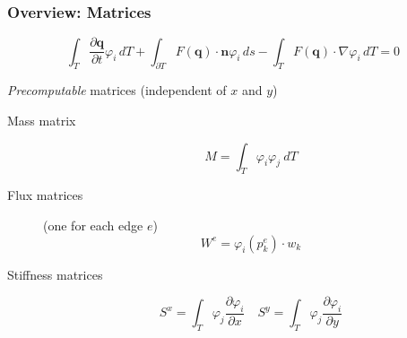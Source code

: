 \documentclass{beamer}
\newcommand{\pd}[2]{\dfrac{\partial #1}{\partial #2}}
\renewcommand{\phi}{\varphi}
\begin{document}

\begin{frame}
  \frametitle{Overview: Matrices}
  \vspace{-.3cm}
  \begin{equation*}
    \int_T \pd {\mathbf{q}}{t} \phi_i \, dT +
    \int_{\partial T} F(\mathbf{q}) \cdot \mathbf{n} \phi_i \, ds -
    \int_T F(\mathbf{q}) \cdot \nabla \phi_i \, dT = 0
  \end{equation*}
  \begin{block}{\emph{Precomputable} matrices (independent of $x$ and $y$)}
    \begin{description}
    \item[Mass matrix]
      \begin{equation}
        \label{eq:mass-matrix-overview}
        M = \int_T \phi_i \phi_j \ dT
      \end{equation}
    \item[Flux matrices] (one for each edge $e$) %
      \begin{equation}
        \label{eq:edge-matrices}
        W^e = \phi_i\left(p_k^e\right) \cdot w_k
      \end{equation}
    \item[Stiffness matrices]
      \begin{equation}
        \label{eq:stiffness-matrix-overview}
        S^x = \int_T \phi_j \pd{\phi_i}{x} \quad
        S^y = \int_T \phi_j \pd{\phi_i}{y}
      \end{equation}
    \end{description}
  \end{block}
\end{frame}
\end{document}
